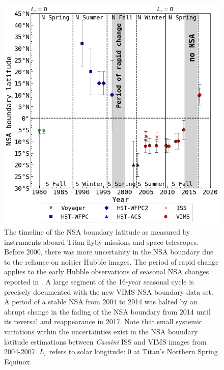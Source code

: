 \documentclass[apj,tighten]{emulateapj}
\begin{document}
\begin{figure}[tbhp]
\centering
\includegraphics[width=\textwidth]{figures/nsa_lat_timeline.png}
\caption{\footnotesize The timeline of the NSA boundary latitude as measured by instruments aboard Titan flyby missions and space telescopes. Before 2000, there was more uncertainty in the NSA boundary due to the reliance on noisier Hubble images. The period of rapid change applies to the early Hubble observations of seasonal NSA changes reported in \cite{lorenz2001titan}. A large segment of the 16-year seasonal cycle is precisely documented with the new VIMS NSA boundary data set. A period of a stable NSA from 2004 to 2014 was halted by an abrupt change in the fading of the NSA boundary from 2014 until its reversal and reappearance in 2017. 
Note that small systemic variations within the uncertainties exist in the NSA boundary latitude estimations between \textit{Cassini} ISS and VIMS images from 2004-2007. $L_s$ refers to solar longitude: 0\degree{} at Titan's Northern Spring Equinox.
\label{figure:nsaTime}}
\end{figure}
\end{document}
